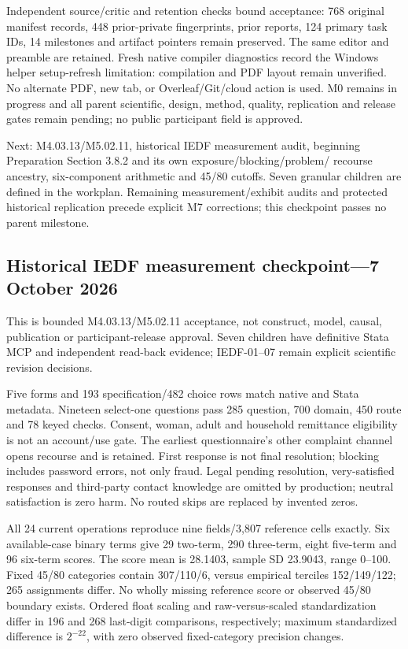 \documentclass[11pt,a4paper]{article}
\begin{document}
Independent source/critic and retention checks bound acceptance:
768 original manifest records, 448 prior-private fingerprints, prior reports,
124 primary task IDs, 14 milestones and artifact pointers remain preserved.
The same editor and preamble are retained. Fresh native compiler
diagnostics record the Windows helper setup-refresh limitation:
compilation and PDF layout remain unverified. No alternate PDF,
new tab, or Overleaf/Git/cloud action is used. M0 remains in progress
and all parent scientific, design, method, quality, replication and
release gates remain pending; no public participant field is approved.

Next: M4.03.13/M5.02.11, historical IEDF measurement audit,
beginning Preparation Section 3.8.2 and its own exposure/blocking/problem/
recourse ancestry, six-component arithmetic and 45/80 cutoffs.
Seven granular children are defined in the workplan. Remaining
measurement/exhibit audits and protected historical replication precede
explicit M7 corrections; this checkpoint passes no parent milestone.

\subsection{Historical IEDF measurement checkpoint---7 October 2026}
This is bounded M4.03.13/M5.02.11 acceptance, not construct,
model, causal, publication or participant-release approval.
Seven children have definitive Stata MCP and independent read-back
evidence; IEDF-01--07 remain explicit scientific revision decisions.

Five forms and 193 specification/482 choice rows match native and Stata
metadata. Nineteen select-one questions pass 285 question, 700 domain,
450 route and 78 keyed checks. Consent, woman, adult and household
remittance eligibility is not an account/use gate.
The earliest questionnaire's other complaint channel opens
recourse and is retained. First response is not final resolution;
blocking includes password errors, not only fraud.
Legal pending resolution, very-satisfied responses and third-party
contact knowledge are omitted by production; neutral satisfaction
is zero harm. No routed skips are replaced by invented zeros.

All 24 current operations reproduce nine fields/3,807 reference
cells exactly. Six available-case binary terms give 29 two-term,
290 three-term, eight five-term and 96 six-term scores.
The score mean is 28.1403, sample SD 23.9043, range 0--100.
Fixed 45/80 categories contain 307/110/6, versus empirical
terciles 152/149/122; 265 assignments differ.
No wholly missing reference score or observed 45/80 boundary exists.
Ordered float scaling and raw-versus-scaled standardization differ
in 196 and 268 last-digit comparisons, respectively; maximum
standardized difference is \(2^{-22}\), with zero observed
fixed-category precision changes.
\end{document}
